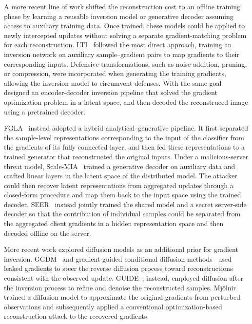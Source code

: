A more recent line of work shifted the reconstruction cost to an offline training phase by learning a reusable inversion model or generative decoder assuming access to auxiliary training data. Once trained, these models could be applied to newly intercepted updates without solving a separate gradient-matching problem for each reconstruction. LTI~\cite{wu2023learning} followed the most direct approach, training an inversion network on auxiliary sample–gradient pairs to map gradients to their corresponding inputs. Defensive transformations, such as noise addition, pruning, or compression, were incorporated when generating the training gradients, allowing the inversion model to circumvent defenses. With the same goal~ designed an encoder-decoder inversion pipeline that solved the gradient optimization problem in a latent space, and then decoded the reconstruced image using a pretrained decoder.

FGLA~\cite{xueFastGenerationBasedGradient2023c} instead adopted a hybrid analytical–generative pipeline. It first separated the sample-level representations corresponding to the input of the classifier from the gradients of its fully connected layer, and then fed these representations to a trained generator that reconstructed the original inputs. Under a malicious-server threat model, Scale-MIA~\cite{shiScaleMIAScalableModel2025} trained a generative decoder on auxiliary data and crafted linear layers in the latent space of the distributed model. The attacker could then recover latent representations from aggregated updates through a closed-form procedure and map them back to the input space using the trained decoder. SEER~\cite{garovHidingPlainSight2024} instead jointly trained the shared model and a secret server-side decoder so that the contribution of individual samples could be separated from the aggregated client gradients in a hidden representation space and then decoded offline on the server.

More recent work explored diffusion models as an additional prior for gradient inversion. GGDM~\cite{guFederatedLearningVulnerabilities2024} and gradient-guided conditional diffusion methods~\cite{huangGradientGuidedConditionalDiffusion2024, mengEnhancedPrivacyLeakage2025} used leaked gradients to steer the reverse diffusion process toward reconstructions consistent with the observed update. GUIDE~\cite{carlettiGUIDEEnhancingGradient2025}, instead, employed diffusion after the inversion process to refine and denoise the reconstructed samples. Mjölnir~\cite{liu2025mjolnirbreakingshieldperturbationprotected} trained a diffusion model to approximate the original gradients from perturbed observations and subsequently applied a conventional optimization-based reconstruction attack to the recovered gradients.


